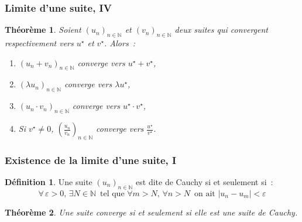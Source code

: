 \documentclass[10pt,notheorems]{beamer}
\theoremstyle{plain}
\newtheorem{theorem}{Théorème}
\theoremstyle{definition} %
\newtheorem{definition}{Définition}
\begin{document}
\begin{frame}
  \frametitle{Limite d'une suite, IV}


  \begin{theorem}
    Soient $(u_n)_{n\in\mathbb N}$ et $(v_n)_{n\in\mathbb N}$ deux suites qui convergent respectivement vers $u^{\star}$ et $v^{\star}$. Alors~:\newline

    \begin{enumerate}

    \item $(u_n+v_n)_{n\in\mathbb N}$ converge vers $u^{\star}+v^{\star}$,\newline

    \item $(\lambda u_n)_{n\in\mathbb N}$ converge vers $\lambda u^{\star}$,\newline

    \item $(u_n\cdot v_n)_{n\in\mathbb N}$ converge vers $u^{\star}\cdot v^{\star}$,\newline

    \item Si $v^{\star}\neq 0$, $\left(\frac{u_n}{v_n}\right)_{n\in\mathbb N}$ converge vers $\frac{u^{\star}}{v^{\star}}$.\newline
    \end{enumerate}
  \end{theorem}

\end{frame}



\begin{frame}
  \frametitle{Existence de la limite d'une suite, I}

  \begin{definition}
    Une suite $(u_n)_{n\in\mathbb N}$ est dite de Cauchy si et seulement si~:
    \[
      \forall\,\varepsilon>0,\, \exists N\in\mathbb N\,\text{ tel que } \forall m>N,\, \forall n>N\, \text{ on ait }|u_n-u_m|<\varepsilon
    \]
  \end{definition}

  \bigskip\bigskip

  \begin{theorem}
    Une suite converge si et seulement si elle est une suite de Cauchy.
  \end{theorem}

\end{frame}
\end{document}

